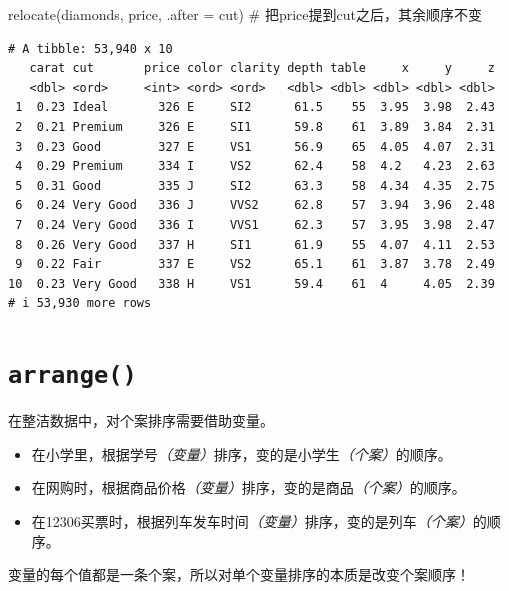\documentclass[
  letterpaper,
]{ctexbook}
\newenvironment{Shaded}{\begin{snugshade}}{\end{snugshade}}
\newcommand{\AttributeTok}[1]{\textcolor[rgb]{0.40,0.45,0.13}{#1}}
\newcommand{\CommentTok}[1]{\textcolor[rgb]{0.37,0.37,0.37}{#1}}
\newcommand{\FunctionTok}[1]{\textcolor[rgb]{0.28,0.35,0.67}{#1}}
\newcommand{\NormalTok}[1]{\textcolor[rgb]{0.00,0.23,0.31}{#1}}
\providecommand{\tightlist}{%
  \setlength{\itemsep}{0pt}\setlength{\parskip}{0pt}}\usepackage{longtable,booktabs,array}
\begin{document}
\begin{Shaded}
\begin{Highlighting}[]
\FunctionTok{relocate}\NormalTok{(diamonds, price, }\AttributeTok{.after =}\NormalTok{ cut) }\CommentTok{\# 把price提到cut之后，其余顺序不变}
\end{Highlighting}
\end{Shaded}

\begin{verbatim}
# A tibble: 53,940 x 10
   carat cut       price color clarity depth table     x     y     z
   <dbl> <ord>     <int> <ord> <ord>   <dbl> <dbl> <dbl> <dbl> <dbl>
 1  0.23 Ideal       326 E     SI2      61.5    55  3.95  3.98  2.43
 2  0.21 Premium     326 E     SI1      59.8    61  3.89  3.84  2.31
 3  0.23 Good        327 E     VS1      56.9    65  4.05  4.07  2.31
 4  0.29 Premium     334 I     VS2      62.4    58  4.2   4.23  2.63
 5  0.31 Good        335 J     SI2      63.3    58  4.34  4.35  2.75
 6  0.24 Very Good   336 J     VVS2     62.8    57  3.94  3.96  2.48
 7  0.24 Very Good   336 I     VVS1     62.3    57  3.95  3.98  2.47
 8  0.26 Very Good   337 H     SI1      61.9    55  4.07  4.11  2.53
 9  0.22 Fair        337 E     VS2      65.1    61  3.87  3.78  2.49
10  0.23 Very Good   338 H     VS1      59.4    61  4     4.05  2.39
# i 53,930 more rows
\end{verbatim}

\hypertarget{arrange}{%
\section{\texorpdfstring{\texttt{arrange()}}{arrange()}}\label{arrange}}

在整洁数据中，对个案排序需要借助变量。

\begin{itemize}
\tightlist
\item
  在小学里，根据学号{\emph{（变量）}}排序，变的是小学生{\emph{（个案）}}的顺序。
\item
  在网购时，根据商品价格{\emph{（变量）}}排序，变的是商品{\emph{（个案）}}的顺序。
\item
  在12306买票时，根据列车发车时间{\emph{（变量）}}排序，变的是列车{\emph{（个案）}}的顺序。
\end{itemize}

\begin{tcolorbox}[enhanced jigsaw, bottomtitle=1mm, bottomrule=.15mm, coltitle=black, title=\textcolor{quarto-callout-important-color}{\faExclamation}\hspace{0.5em}{重要}, toptitle=1mm, colframe=quarto-callout-important-color-frame, colbacktitle=quarto-callout-important-color!10!white, opacitybacktitle=0.6, arc=.35mm, opacityback=0, breakable, toprule=.15mm, left=2mm, titlerule=0mm, rightrule=.15mm, colback=white, leftrule=.75mm]

变量的每个值都是一条个案，所以对单个变量排序的本质是改变个案顺序！

\end{tcolorbox}
\end{document}
